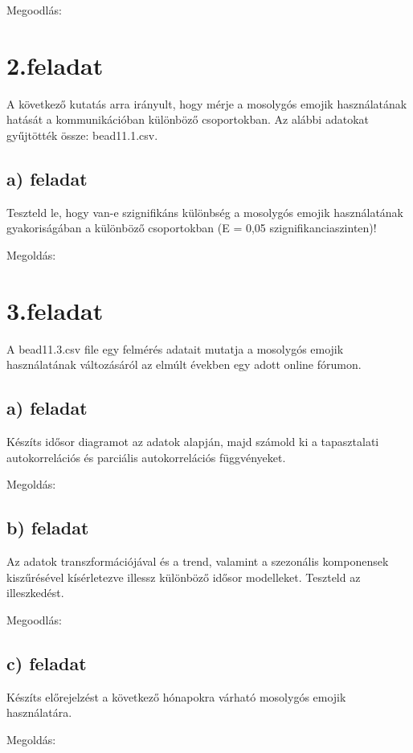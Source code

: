 \documentclass[11pt,a4paper,oneside]{report}
\begin{document}
Megoodlás:


\chapter{2.feladat}
A következő kutatás arra irányult, hogy mérje a mosolygós emojik használatának hatását a kommunikációban különböző csoportokban. Az alábbi adatokat gyűjtötték  össze: bead11.1.csv.

\section{a) feladat}
Teszteld le, hogy van-e szignifikáns különbség a mosolygós emojik használatának gyakoriságában a különböző csoportokban (E = 0,05 szignifikanciaszinten)!

Megoldás:

\chapter{3.feladat}
A bead11.3.csv file egy felmérés adatait mutatja a mosolygós emojik használatának változásáról az elmúlt években egy adott online fórumon.

\section{a) feladat}
Készíts idősor diagramot az adatok alapján, majd számold ki a tapasztalati autokorrelációs és parciális autokorrelációs függvényeket.

Megoldás:
\section{b) feladat}
Az adatok transzformációjával és a trend, valamint a szezonális komponensek kiszűrésével kísérletezve illessz különböző idősor modelleket. Teszteld az illeszkedést.

Megoodlás:

\section{c) feladat}
Készíts előrejelzést a következő hónapokra várható mosolygós emojik használatára.

Megoldás:
\end{document}

